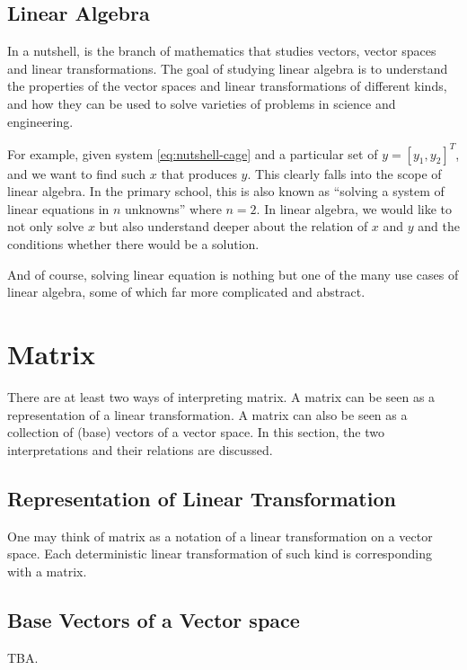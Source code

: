 \subsection{Linear Algebra}

In a nutshell,  is the branch of mathematics that studies vectors, vector spaces and linear transformations. The goal of studying linear algebra is to understand the properties of the vector spaces and linear transformations of different kinds, and how they can be used to solve varieties of problems in science and engineering.

For example, given system \eqref{eq:nutshell-cage} and a particular set of $y = [y_1, y_2]^T$, and we want to find such $x$ that produces $y$. This clearly falls into the scope of linear algebra. In the primary school, this is also known as ``solving a system of linear equations in $n$ unknowns'' where $n=2$. In linear algebra, we would like to not only solve $x$ but also understand deeper about the relation of $x$ and $y$ and the conditions whether there would be a solution.

And of course, solving linear equation is nothing but one of the many use cases of linear algebra, some of which far more complicated and abstract.

\section{Matrix} \label{sec:nutshell-matrix}

There are at least two ways of interpreting matrix. A matrix can be seen as a representation of a linear transformation. A matrix can also be seen as a collection of (base) vectors of a vector space. In this section, the two interpretations and their relations are discussed. 

\subsection{Representation of Linear Transformation}

One may think of matrix as a notation of a linear transformation on a vector space. Each deterministic linear transformation of such kind is corresponding with a matrix. 

\subsection{Base Vectors of a Vector space}

TBA. 